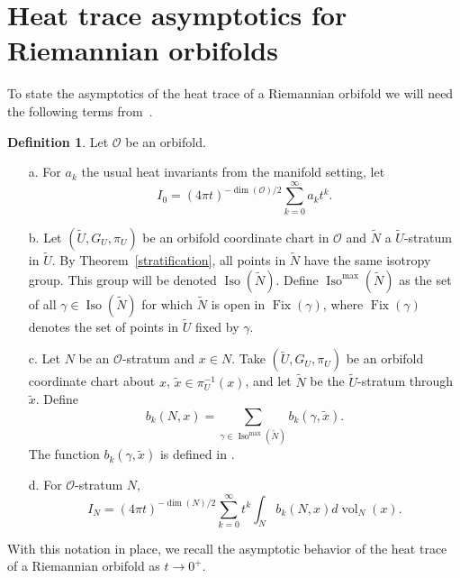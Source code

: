 \documentclass{amsart}
\theoremstyle{plain}
\theoremstyle{definition}
\newtheorem{defn}[thm]{Definition}
\theoremstyle{remark}
\newcommand{\wtu}{\widetilde{U}}
\newcommand{\orb}{\mathcal O}
\DeclareMathOperator{\iso}{Iso}
\DeclareMathOperator{\fix}{Fix}
\DeclareMathOperator{\vol}{vol}
\begin{document}
\section{Heat trace asymptotics for Riemannian orbifolds}

To state the asymptotics of the heat trace of a Riemannian orbifold we will
need the following terms from~\cite{dggw}.

\begin{defn} Let $\orb$ be an orbifold.
\label{def:formulas}
\begin{itemize}
\item[a.] For $a_k$ the usual heat invariants from the manifold setting, let $$I_0=(4\pi t)^{-\dim(\orb)/2} \sum_{k=0}^\infty a_k t^k.$$ 
\item[b.] Let  $(\widetilde{U}, G_U, \pi_U)$ be an orbifold coordinate chart in $\orb$ and $\widetilde{N}$ a $\wtu$-stratum in $\wtu$. By Theorem~\ref{stratification}, all points in $\widetilde{N}$ have the same isotropy group.  This group will be denoted $\iso(\widetilde{N})$.  Define $\iso^{\max}(\widetilde{N})$ as the set of all $\gamma \in \iso(\widetilde{N})$ for which $\widetilde{N}$ is open in $\fix(\gamma)$, where $\fix(\gamma)$ denotes the set of points in $\wtu$ fixed by $\gamma$.
\item[c.] Let $N$ be an $\orb$-stratum and $x\in N$.  Take $(\widetilde{U}, G_U, \pi_U)$ be an orbifold coordinate chart about $x$, $\tilde x \in \pi_U^{-1}(x)$, and let $\widetilde{N}$ be the $\widetilde{U}$-stratum through $\tilde x$.  Define
 \[b_k(N,x) = \sum_{\gamma \in \iso^{\max}(\widetilde{N})} b_k(\gamma,\tilde{x}).\]
 The function $b_k(\gamma,\tilde{x})$ is defined in \cite[Section 4.2]{dggw}.
\item[d.] For $\orb$-stratum $N$, $$I_N=(4\pi t)^{-\dim(N)/2}\sum_{k=0}^\infty t^k \int_N b_k(N,x) d\vol_N(x).$$
\end{itemize}
\end{defn}

With this notation in place, we recall the asymptotic behavior of the heat trace of a Riemannian orbifold as $t\rightarrow 0^+$.
\end{document}
